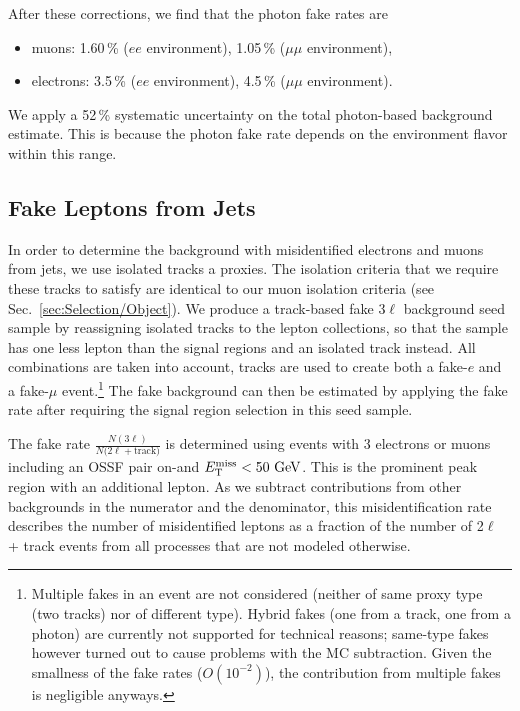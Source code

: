After these corrections, we find that the photon fake rates are
\begin{itemize}
	\item muons: 1.60\,\% ($ee$ environment), 1.05\,\% ($\mu\mu$ environment),
	\item electrons: 3.5\,\% ($ee$ environment), 4.5\,\% ($\mu\mu$ environment).
\end{itemize}

We apply a 52\,\% systematic uncertainty on the total photon-based background estimate. This is because the photon fake rate depends on the environment flavor within this range.


\subsection{Fake Leptons from Jets}
In order to determine the background with misidentified electrons and muons from jets, we use isolated tracks a proxies. The isolation criteria that we require these tracks to satisfy are identical to our muon isolation criteria (see Sec.~\ref{sec:Selection/Object}). We produce a track-based fake 3$\ell$ background seed sample by reassigning isolated tracks to the lepton collections, so that the sample has one less lepton than the signal regions and an isolated track instead. All combinations are taken into account, \ie tracks are used to create both a fake-$e$ and a fake-$\mu$ event.\footnote{Multiple fakes in an event are not considered (neither of same proxy type (\eg two tracks) nor of different type). Hybrid fakes (one from a track, one from a photon) are currently not supported for technical reasons; same-type fakes however turned out to cause problems with the \ttbar MC subtraction. Given the smallness of the fake rates ($O(10^{-2})$), the contribution from multiple fakes is negligible anyways.} The fake background can then be estimated by applying the fake rate after requiring the signal region selection in this seed sample.

The fake rate $\frac{N(3\ell)}{N(2\ell + \textrm{track)}}$ is determined using events with 3 electrons or muons including an OSSF pair on-\Z and $E_{\mathrm{T}}^{\text{miss}} < 50\,\,\text{Ge\hspace{-.08em}V}$. This is the prominent \Z peak region with an additional lepton. As we subtract contributions from other backgrounds in the numerator and the denominator, this misidentification rate describes the number of misidentified leptons as a fraction of the number of 2$\ell$ + track events from all processes that are not modeled otherwise.

